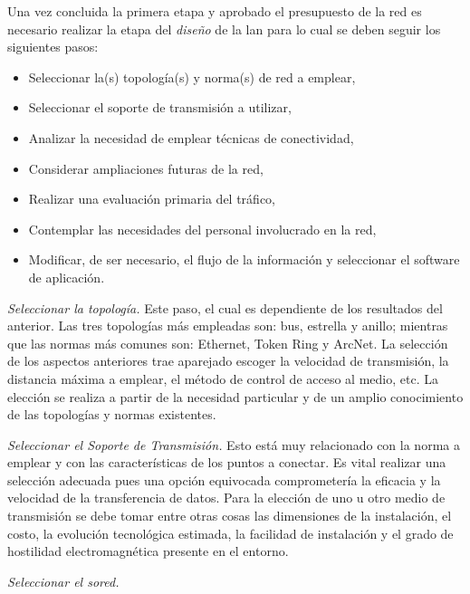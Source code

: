 Una vez concluida la primera etapa y aprobado el presupuesto de la red es necesario realizar la etapa del \textit{diseño} de la \gls{lan} para lo cual se deben seguir los siguientes pasos:

\renewcommand{\labelitemi}{$-$}

\begin{itemize}
\item Seleccionar la(s) topología(s) y norma(s) de red a emplear,
\item Seleccionar el soporte de transmisión a utilizar,
\item Analizar la necesidad de emplear técnicas de conectividad,
\item Considerar ampliaciones futuras de la red,
\item Realizar una evaluación primaria del tráfico,
\item Contemplar las necesidades del personal involucrado en la red,
\item Modificar, de ser necesario, el flujo de la información y seleccionar el software de aplicación.
\end{itemize}

\textit{Seleccionar la topología.} Este paso, el cual es dependiente de los resultados del anterior. Las tres topologías más empleadas son: bus, estrella y anillo; mientras que las normas más comunes son: Ethernet, Token Ring y ArcNet. La selección de los aspectos anteriores trae aparejado escoger la velocidad de transmisión, la distancia máxima a emplear, el método de control de acceso al medio, etc. La elección se realiza a partir de la necesidad particular y de un amplio conocimiento de las topologías y normas existentes. 

\textit{Seleccionar el Soporte de Transmisión.} Esto está muy relacionado con la norma a emplear y con las características de los puntos a conectar. Es vital realizar una selección adecuada pues una opción equivocada comprometería la eficacia y la velocidad de la transferencia de datos. Para la elección de uno u otro medio de transmisión se debe tomar entre otras cosas las dimensiones de la instalación, el costo, la evolución tecnológica estimada, la facilidad de instalación y el grado de hostilidad electromagnética presente en el entorno. 


\textit{Seleccionar el \gls{sored}.}

